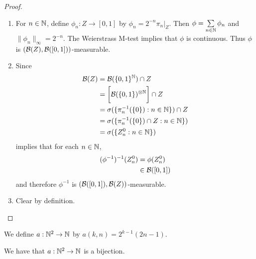 \documentclass{book}
\begin{document}
	\begin{proof}\
		\begin{enumerate}
			\item For $n \in \mathbb{N}$, define $\phi_n: Z \rightarrow [0, 1]$ by $\phi_n = 2^{-n}\pi_n|_{Z}$. Then $\phi = \sum\limits_{n \in \mathbb{N}} \phi_n$ and $\|\phi_n\|_{\infty} = 2^{-n}$. The Weierstrass M-test implies that $\phi$ is continuous. Thus $\phi$ is $(\mathcal{B}(Z), \mathcal{B}([0,1]))$-measurable. \\
			\item Since 
			\begin{align*}
				\mathcal{B}(Z) 
				& = \mathcal{B}(\{0, 1\}^{\mathbb{N}}) \cap Z \\
				& = \bigg[ \mathcal{B}(\{0,1\})^{\otimes \mathbb{N}} \bigg] \cap Z \\
				& = \sigma(\{\pi_n^{-1}(\{0\}): n \in \mathbb{N}\}) \cap Z \\
				& = \sigma (\{\pi_n^{-1}(\{0\}) \cap Z: n \in \mathbb{N}\} )\\
				& = \sigma (\{Z_n^0: n \in \mathbb{N}\})
			\end{align*}
			 implies that for each $n \in \mathbb{N}$, 
			\begin{align*}
				(\phi^{-1})^{-1} (Z_n^0) 
				& = \phi(Z_n^0) \\
				& \in \mathcal{B}([0,1]) \\
			\end{align*}
			and therefore $\phi^{-1}$ is $(\mathcal{B}([0,1]), \mathcal{B}(Z))$-measurable.
			\item Clear by definition.
		\end{enumerate}
	\end{proof}
	
	\begin{defn} 
		We define $a: \mathbb{N}^2 \rightarrow \mathbb{N}$ by $a(k,n) = 2^{k-1}(2n-1)$. 
	\end{defn}
	
	\begin{ex} 
		We have that $a: \mathbb{N}^2 \rightarrow \mathbb{N}$ is a bijection.
	\end{ex}
	
\end{document}
